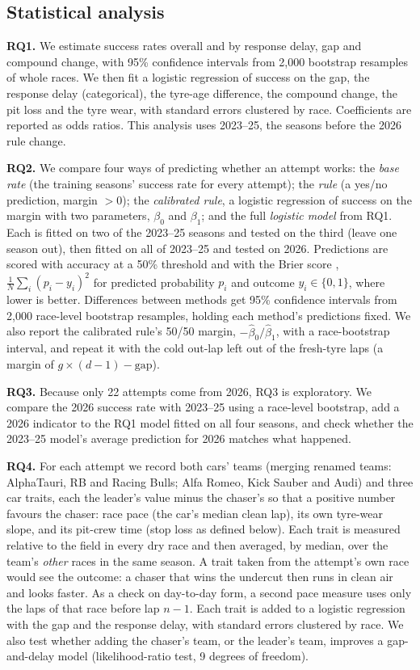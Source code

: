 \documentclass[12pt]{article}
\begin{document}
\subsection{Statistical analysis}
\textbf{RQ1.} We estimate success rates overall and by response delay, gap and compound change, with 95\% confidence intervals from 2,000 bootstrap resamples of whole races. We then fit a logistic regression of success on the gap, the response delay (categorical), the tyre-age difference, the compound change, the pit loss and the tyre wear, with standard errors clustered by race. Coefficients are reported as odds ratios. This analysis uses 2023--25, the seasons before the 2026 rule change.

\textbf{RQ2.} We compare four ways of predicting whether an attempt works: the \emph{base rate} (the training seasons' success rate for every attempt); the \emph{rule} (a yes/no prediction, margin $> 0$); the \emph{calibrated rule}, a logistic regression of success on the margin with two parameters, $\beta_0$ and $\beta_1$; and the full \emph{logistic model} from RQ1. Each is fitted on two of the 2023--25 seasons and tested on the third (leave one season out), then fitted on all of 2023--25 and tested on 2026. Predictions are scored with accuracy at a 50\% threshold and with the Brier score \citep{brier1950verification}, $\frac{1}{N}\sum_{i}(p_i - y_i)^2$ for predicted probability $p_i$ and outcome $y_i \in \{0,1\}$, where lower is better. Differences between methods get 95\% confidence intervals from 2,000 race-level bootstrap resamples, holding each method's predictions fixed. We also report the calibrated rule's 50/50 margin, $-\hat\beta_0/\hat\beta_1$, with a race-bootstrap interval, and repeat it with the cold out-lap left out of the fresh-tyre laps (a margin of $g \times (d-1) - \text{gap}$).

\textbf{RQ3.} Because only 22 attempts come from 2026, RQ3 is exploratory. We compare the 2026 success rate with 2023--25 using a race-level bootstrap, add a 2026 indicator to the RQ1 model fitted on all four seasons, and check whether the 2023--25 model's average prediction for 2026 matches what happened.

\textbf{RQ4.} For each attempt we record both cars' teams (merging renamed teams: AlphaTauri, RB and Racing Bulls; Alfa Romeo, Kick Sauber and Audi) and three car traits, each the leader's value minus the chaser's so that a positive number favours the chaser: race pace (the car's median clean lap), its own tyre-wear slope, and its pit-crew time (stop loss as defined below). Each trait is measured relative to the field in every dry race and then averaged, by median, over the team's \emph{other} races in the same season. A trait taken from the attempt's own race would see the outcome: a chaser that wins the undercut then runs in clean air and looks faster. As a check on day-to-day form, a second pace measure uses only the laps of that race before lap $n-1$. Each trait is added to a logistic regression with the gap and the response delay, with standard errors clustered by race. We also test whether adding the chaser's team, or the leader's team, improves a gap-and-delay model (likelihood-ratio test, 9 degrees of freedom).
\end{document}
